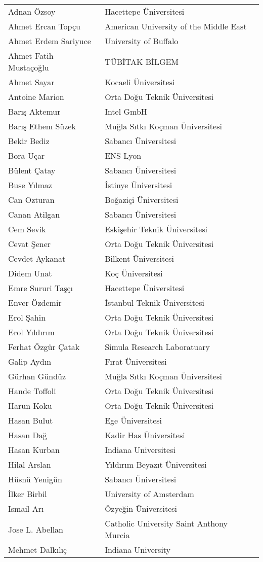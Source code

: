 \begin{center}
\begin{tabular}{ll}
Adnan Özsoy & Hacettepe Üniversitesi \\
Ahmet Ercan Topçu & American University of the Middle East \\
Ahmet Erdem Sariyuce & University of Buffalo \\
Ahmet Fatih Mustaçoğlu & TÜBİTAK BİLGEM \\
Ahmet Sayar & Kocaeli Üniversitesi  \\
Antoine Marion & Orta Doğu Teknik Üniversitesi \\
Barış Aktemur & Intel GmbH \\
Barış Ethem Süzek & Muğla Sıtkı Koçman Üniversitesi \\
Bekir Bediz & Sabancı Üniversitesi \\
Bora Uçar & ENS Lyon \\
Bülent Çatay & Sabancı Üniversitesi \\
Buse Yılmaz & İstinye Üniversitesi \\
Can Ozturan & Boğaziçi Üniversitesi \\
Canan Atilgan & Sabancı Üniversitesi \\
Cem Sevik & Eskişehir Teknik Üniversitesi \\
Cevat Şener & Orta Doğu Teknik Üniversitesi \\
Cevdet Aykanat & Bilkent Üniversitesi \\
Didem Unat & Koç Üniversitesi \\
Emre Sururi Taşçı & Hacettepe Üniversitesi \\
Enver Özdemir & İstanbul Teknik Üniversitesi \\
Erol Şahin & Orta Doğu Teknik Üniversitesi \\
Erol Yıldırım & Orta Doğu Teknik Üniversitesi \\
Ferhat Özgür Çatak & Simula Research Laboratuary \\
Galip Aydın & Fırat Üniversitesi \\
Gürhan Gündüz & Muğla Sıtkı Koçman Üniversitesi \\
Hande Toffoli & Orta Doğu Teknik Üniversitesi \\
Harun Koku & Orta Doğu Teknik Üniversitesi \\
Hasan Bulut & Ege Üniversitesi \\
Hasan Dağ & Kadir Has Üniversitesi \\
Hasan Kurban & Indiana Universitesi \\
Hilal Arslan & Yıldırım Beyazıt Üniversitesi \\
Hüsnü Yenigün & Sabancı Üniversitesi \\
İlker Birbil & University of Amsterdam \\
Ismail Arı & Özyeğin Üniversitesi \\
Jose L. Abellan & Catholic University Saint Anthony Murcia \\
Mehmet Dalkılıç & Indiana University \\
\end{tabular}
\end{center}

